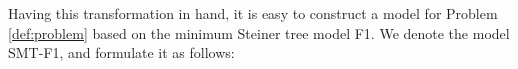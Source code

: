 

Having this transformation in hand, it is easy to construct a model for Problem \ref{def:problem} based on the minimum Steiner tree model F1. We denote the model SMT-F1, and formulate it as follows:

